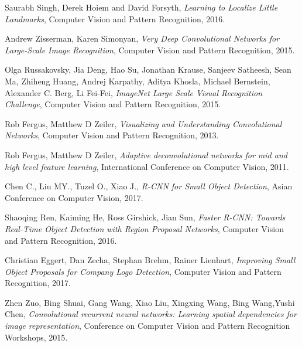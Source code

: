 \documentclass [11pt,letterpaper ,twoside ,openany ]{report}
\begin{document}
    \begin{thebibliography}{9}
          Saurabh Singh, Derek Hoiem and David Forsyth,
          \textit{Learning to Localize Little Landmarks},
          Computer Vision and Pattern Recognition,
          2016.          

          Andrew Zisserman, Karen Simonyan,
          \textit{Very Deep Convolutional Networks for Large-Scale Image Recognition},
          Computer Vision and Pattern Recognition,
          2015.                    

          Olga Russakovsky, Jia Deng, Hao Su, Jonathan Krause, Sanjeev Satheesh, Sean Ma, Zhiheng Huang, Andrej Karpathy, Aditya Khosla, Michael Bernstein, Alexander C. Berg, Li Fei-Fei,
          \textit{ImageNet Large Scale Visual Recognition Challenge},
          Computer Vision and Pattern Recognition,
          2015.                    

          Rob Fergus, Matthew D Zeiler,
          \textit{Visualizing and Understanding Convolutional Networks},
          Computer Vision and Pattern Recognition,
          2013.                              

          Rob Fergus, Matthew D Zeiler,
          \textit{Adaptive deconvolutional networks for mid and high level feature learning},
          International Conference on Computer Vision,
          2011.

          Chen C., Liu MY., Tuzel O., Xiao J.,
          \textit{R-CNN for Small Object Detection},
          Asian Conference on Computer Vision,
          2017.          

          Shaoqing Ren, Kaiming He, Ross Girshick, Jian Sun,
          \textit{Faster R-CNN: Towards Real-Time Object Detection with Region Proposal Networks},
          Computer Vision and Pattern Recognition,
          2016.                    

          Christian Eggert, Dan Zecha, Stephan Brehm, Rainer Lienhart,
          \textit{Improving Small Object Proposals for Company Logo Detection},
          Computer Vision and Pattern Recognition,
          2017.                              

          Zhen Zuo, Bing Shuai, Gang Wang, Xiao Liu, Xingxing Wang, Bing Wang,Yushi Chen,
          \textit{Convolutional recurrent neural networks: Learning spatial dependencies for image representation},
          Conference on Computer Vision and Pattern Recognition Workshops,
          2015.                                        


\end{thebibliography}
\end{document}
